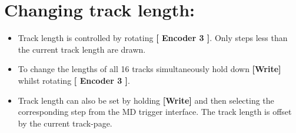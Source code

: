\vspace{-0.3cm}

\section{Changing track length:}
\begin{itemize}
\item Track length is controlled by rotating \textbf{[ Encoder 3 ]}. Only steps less than the current track length are drawn.
\item To change the lengths of all 16 tracks simultaneously hold down \textbf{[Write]} whilst rotating \textbf{[ Encoder 3 ]}.
\item Track length can also be set by holding \textbf{[Write]} and then selecting the corresponding step from the MD trigger interface. The track length is offset by the current track-page.
\end{itemize}

